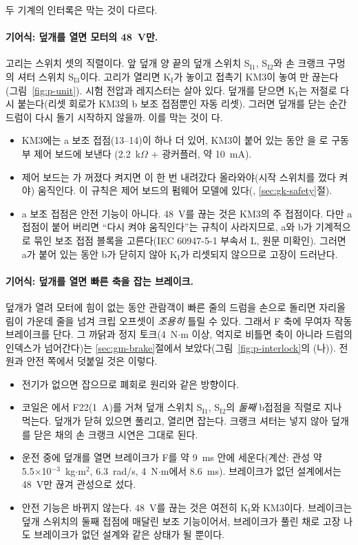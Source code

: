\Ours 두 기계의 인터록은 막는 것이 다르다.

\paragraph{기어식: 덮개를 열면 모터의 48~V만.} 고리는 스위치 셋의 직렬이다. 앞 덮개 양 끝의 덮개 스위치 S$_\mathrm{I1}$, S$_\mathrm{I2}$와
손 크랭크 구멍의 셔터 스위치 S$_\mathrm{I3}$이다. 고리가 열리면 K$_\mathrm{I}$가 놓이고 접촉기 KM3이 놓여 만 끊는다
(그림~\ref{fig:p-unit}). 시험 전압과 레지스터는 살아 있다. 덮개를 닫으면 K$_\mathrm{I}$는 저절로 다시 붙는다(리셋 회로가 KM3의 b
보조 접점뿐인 자동 리셋). 그러면 덮개를 닫는 순간 드럼이 다시 돌기 시작하지 않을까. 이를 막는 것이 다.
\begin{itemize}
\item KM3에는 a 보조 접점(13--14)이 하나 더 있어, KM3이 붙어 있는 동안 을 로 구동부 제어 보드에 보낸다
(2.2~k$\Omega$ + 광커플러, 약 10~mA).
\item 제어 보드는 가 꺼졌다 켜지면 이 한 번 내려갔다 올라와야(시작 스위치를 껐다 켜야) 움직인다. 이 규칙은 제어
보드의 펌웨어 모델에 있다(, \ref{sec:gk-safety}절).
\item a 보조 접점은 안전 기능이 아니다. 48~V를 끊는 것은 KM3의 주 접점이다. 다만 a 접점이 붙어 버리면 ``다시 켜야 움직인다''는 규칙이
사라지므로, a와 b가 기계적으로 묶인 보조 접점 블록을 고른다(IEC 60947-5-1 부속서 L, 원문 미확인). 그러면 a가 붙어 있는 동안 b가
닫히지 않아 K$_\mathrm{I}$가 리셋되지 않으므로 고장이 드러난다.
\end{itemize}

\paragraph{기어식: 덮개를 열면 빠른 축을 잡는 브레이크.} 덮개가 열려 모터에 힘이 없는 동안 관람객이 빠른 줄의 드럼을 손으로
돌리면 자리올림이 가운데 줄을 넘겨 크립 오프셋이 \emph{조용히} 틀릴 수 있다. 그래서 F 축에 무여자 작동 브레이크를 단다. 그 까닭과
정지 토크(4~N$\cdot$m 이상, 억지로 비틀면 축이 아니라 드럼의 인덱스가 넘어간다)는 \ref{sec:gm-brake}절에서 보았다(그림~\ref{fig:p-interlock}의
(나)). 전원과 안전 쪽에서 덧붙일 것은 이렇다.
\begin{itemize}
\item 전기가 없으면 잡으므로 폐회로 원리와 같은 방향이다.
\item 코일은 에서 F22(1~A)를 거쳐 덮개 스위치 S$_\mathrm{I1}$, S$_\mathrm{I2}$의 \emph{둘째} b접점을 직렬로 지나 먹는다.
덮개가 닫혀 있으면 풀리고, 열리면 잡는다. 크랭크 셔터는 넣지 않아 덮개를 닫은 채의 손 크랭크 시연은 그대로 된다.
\item 운전 중에 덮개를 열면 브레이크가 F를 약 9~ms 안에 세운다(계산: 관성 약 5.5×10$^{-3}$~kg$\cdot$m$^2$, 6.3~rad/s, 4~N$\cdot$m에서
8.6~ms). 브레이크가 없던 설계에서는 48~V만 끊겨 관성으로 섰다.
\item 안전 기능은 바뀌지 않는다. 48~V를 끊는 것은 여전히 K$_\mathrm{I}$와 KM3이다. 브레이크는 덮개 스위치의 둘째 접점에 매달린 보조
기능이어서, 브레이크가 풀린 채로 고장 나도 브레이크가 없던 설계와 같은 상태가 될 뿐이다.
\end{itemize}

